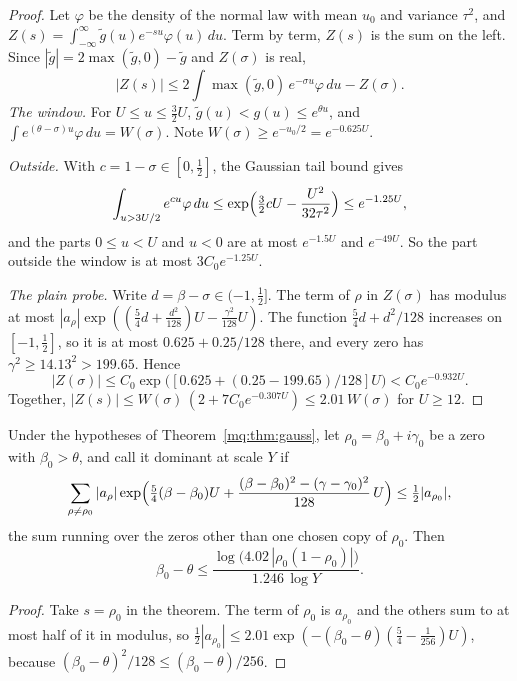 \begin{proof}
Let $\varphi$ be the density of the normal law with mean $u_0$ and variance $\tau^2$, and $Z(s)=\int_{-\infty}^\infty\tilde g(u)e^{-su}\varphi(u)\,du$. Term by term, $Z(s)$ is the sum on the left. Since $|\tilde g|=2\max(\tilde g,0)-\tilde g$ and $Z(\sigma)$ is real,
\[
|Z(s)|\le2\int\max(\tilde g,0)\,e^{-\sigma u}\varphi\,du-Z(\sigma).
\]
\emph{The window.} For $U\le u\le\frac32U$, $\tilde g(u)<g(u)\le e^{\theta u}$, and $\int e^{(\theta-\sigma)u}\varphi\,du=W(\sigma)$. Note $W(\sigma)\ge e^{-u_0/2}=e^{-0.625U}$.

\emph{Outside.} With $c=1-\sigma\in[0,\frac12]$, the Gaussian tail bound gives
\[
\int_{u>3U/2}e^{cu}\varphi\,du\le\exp\Bigl(\tfrac32cU-\frac{U^2}{32\tau^2}\Bigr)\le e^{-1.25U},
\]
and the parts $0\le u<U$ and $u<0$ are at most $e^{-1.5U}$ and $e^{-49U}$. So the part outside the window is at most $3C_0e^{-1.25U}$.

\emph{The plain probe.} Write $d=\beta-\sigma\in(-1,\frac12]$. The term of $\rho$ in $Z(\sigma)$ has modulus at most $|a_\rho|\exp((\frac54d+\frac{d^2}{128})U-\frac{\gamma^2}{128}U)$. The function $\frac54d+d^2/128$ increases on $[-1,\frac12]$, so it is at most $0.625+0.25/128$ there, and every zero has $\gamma^2\ge14.13^2>199.65$. Hence
\[
|Z(\sigma)|\le C_0\exp\bigl([0.625+(0.25-199.65)/128]U\bigr)<C_0e^{-0.932U}.
\]
Together, $|Z(s)|\le W(\sigma)\,(2+7C_0e^{-0.307U})\le2.01\,W(\sigma)$ for $U\ge12$.
\end{proof}

\begin{corollary}\label{mq:cor:dominant}
Under the hypotheses of Theorem~\ref{mq:thm:gauss}, let $\rho_0=\beta_0+i\gamma_0$ be a zero with $\beta_0>\theta$, and call it dominant at scale $Y$ if
\[
\sum_{\rho\ne\rho_0}|a_\rho|\exp\Bigl(\tfrac54(\beta-\beta_0)U+\frac{(\beta-\beta_0)^2-(\gamma-\gamma_0)^2}{128}\,U\Bigr)\le\tfrac12|a_{\rho_0}| ,
\]
the sum running over the zeros other than one chosen copy of $\rho_0$. Then
\[
\beta_0-\theta\le\frac{\log\bigl(4.02\,|\rho_0(1-\rho_0)|\bigr)}{1.246\,\log Y}.
\]
\end{corollary}

\begin{proof}
Take $s=\rho_0$ in the theorem. The term of $\rho_0$ is $a_{\rho_0}$ and the others sum to at most half of it in modulus, so $\frac12|a_{\rho_0}|\le2.01\exp(-(\beta_0-\theta)(\frac54-\frac1{256})U)$, because $(\beta_0-\theta)^2/128\le(\beta_0-\theta)/256$.
\end{proof}

